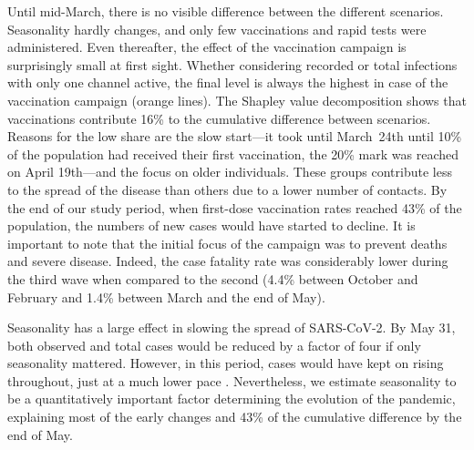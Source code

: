 \begin{figure}[!tp]
\end{figure}

Until mid-March, there is no visible difference between the different scenarios.
Seasonality hardly changes, and only few vaccinations and rapid tests were administered.
Even thereafter, the effect of the vaccination campaign is surprisingly small at first
sight. Whether considering recorded or total infections with only one channel active,
the final level is always the highest in case of the vaccination campaign (orange
lines). The Shapley value decomposition shows that vaccinations contribute 16\% to the
cumulative difference between scenarios. Reasons for the low share are the slow
start---it took until March~24th until 10\% of the population had received their first
vaccination, the 20\% mark was reached on April 19th---and the focus on older
individuals. These groups contribute less to the spread of the disease than others due
to a lower number of contacts. By the end of our study period, when first-dose
vaccination rates reached 43\% of the population, the numbers of new cases would have
started to decline. It is important to note that the initial focus of the campaign was
to prevent deaths and severe disease. Indeed, the case fatality rate was considerably
lower during the third wave when compared to the second (4.4\% between October and
February and 1.4\% between March and the end of May).

Seasonality has a large effect in slowing the spread of SARS-CoV-2. By May 31, both
observed and total cases would be reduced by a factor of four if only seasonality
mattered. However, in this period, cases would have kept on rising throughout, just at a
much lower pace \citep[this is in line with results in][, which our seasonality measure
    is based on]{Gavenciak2021}. Nevertheless, we estimate seasonality to be a
quantitatively important factor determining the evolution of the pandemic, explaining
most of the early changes and 43\% of the cumulative difference by the end of May.

